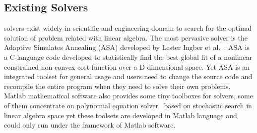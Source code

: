 \subsection{Existing \SA Solvers}
\SA solvers exist widely in scientific and engineering domain to search for the optimal solution of problem related with linear algebra. The most pervasive \SA solver is the Adaptive Simulates Annealing (ASA) developed by Lester Ingber et al.~\cite{Lester:2013}. ASA is a C-language code developed to statistically find the best global fit of a nonlinear constrained non-convex cost-function over a D-dimensional space. Yet ASA is an integrated toolset for general usage and users need to change the source code and recompile the entire program when they need to solve their own problems. Matlab mathematical software also provides some tiny toolboxes for \SA solvers, some of them concentrate on polynomial equation solver~\cite{Matlab:2009} based on stochastic search in linear algebra space yet these toolsets are developed in Matlab language and could only run under the framework of Matlab software. 